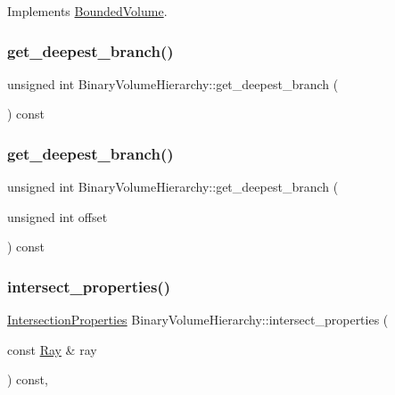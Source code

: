 Implements \mbox{\hyperlink{classBoundedVolume_a281168c4d827c38b46e639f6e4991a9e}{Bounded\+Volume}}.

\mbox{\label{classBinaryVolumeHierarchy_a07a44c476538de97a8c6a2377ad7bb91}} 
\subsubsection{\texorpdfstring{get\_deepest\_branch()}{get\_deepest\_branch()}\hspace{0.1cm}{\footnotesize\ttfamily [1/2]}}
{\footnotesize\ttfamily unsigned int Binary\+Volume\+Hierarchy\+::get\+\_\+deepest\+\_\+branch (\begin{DoxyParamCaption}{ }\end{DoxyParamCaption}) const}

\mbox{\label{classBinaryVolumeHierarchy_aa2f4b148ce800faf6aaf9ae9b616089d}} 
\subsubsection{\texorpdfstring{get\_deepest\_branch()}{get\_deepest\_branch()}\hspace{0.1cm}{\footnotesize\ttfamily [2/2]}}
{\footnotesize\ttfamily unsigned int Binary\+Volume\+Hierarchy\+::get\+\_\+deepest\+\_\+branch (\begin{DoxyParamCaption}\item[{unsigned int}]{offset }\end{DoxyParamCaption}) const\hspace{0.3cm}{\ttfamily [private]}}

\mbox{\label{classBinaryVolumeHierarchy_a91c6b8be167dd13ddbb874d4b9f0cedb}} 
\subsubsection{\texorpdfstring{intersect\_properties()}{intersect\_properties()}}
{\footnotesize\ttfamily \mbox{\hyperlink{classIntersectionProperties}{Intersection\+Properties}} Binary\+Volume\+Hierarchy\+::intersect\+\_\+properties (\begin{DoxyParamCaption}\item[{const \mbox{\hyperlink{classRay}{Ray}} \&}]{ray }\end{DoxyParamCaption}) const\hspace{0.3cm}{\ttfamily [override]}, {\ttfamily [virtual]}}



